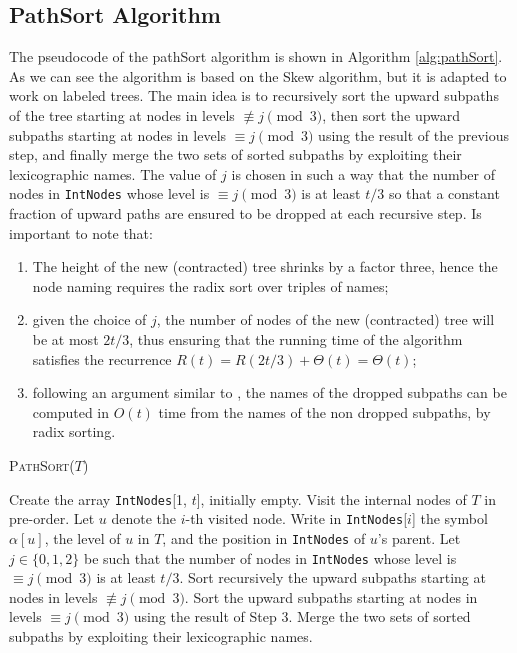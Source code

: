 \subsection{PathSort Algorithm}

The pseudocode of the pathSort algorithm is shown in Algorithm \ref{alg:pathSort}. As we can see the algorithm is based on the Skew algorithm, but it is adapted to work on labeled trees. The main idea is to recursively sort the upward subpaths of the tree starting at nodes in levels $\not\equiv j \pmod{3}$, then sort the upward subpaths starting at nodes in levels $\equiv j \pmod{3}$ using the result of the previous step, and finally merge the two sets of sorted subpaths by exploiting their lexicographic names. The value of $j$ is chosen in such a way that the number of nodes in \texttt{IntNodes} whose level is $\equiv j \pmod{3}$ is at least $t/3$ so that a constant fraction of upward paths are ensured to be dropped at each recursive step. Is important to note that:
\begin{enumerate}
    \item The height of the new (contracted) tree shrinks by a factor three, hence the node naming requires the radix sort over triples of names; 
    \item given the choice of $j$, the number of nodes of the new (contracted) tree will be at most $2t/3$, thus ensuring that the running time of the algorithm satisfies the recurrence $R(t) = R(2t/3) + \Theta(t) = \Theta(t)$; 
    \item following an argument similar to \cite{karkkainen2006linear}, the names of the dropped subpaths can be computed in $O(t)$ time from the names of the non dropped subpaths, by radix sorting.
\end{enumerate}

\begin{algorithm}
    \caption{\textsc{PathSort}($T$)}
    \label{alg:pathSort}
    \begin{algorithmic}[1]
    \State Create the array \texttt{IntNodes}[1, $t$], initially empty.
    \State Visit the internal nodes of $T$ in pre-order. Let $u$ denote the $i$-th visited node.
    \State Write in \texttt{IntNodes}[$i$] the symbol $\alpha[u]$, the level of $u$ in $T$, and the position in \texttt{IntNodes} of $u$'s parent.
    \State Let $j \in \{0, 1, 2\}$ be such that the number of nodes in \texttt{IntNodes} whose level is $\equiv j \pmod{3}$ is at least $t/3$. Sort recursively the upward subpaths starting at nodes in levels $\not\equiv j \pmod{3}$.
    \State Sort the upward subpaths starting at nodes in levels $\equiv j \pmod{3}$ using the result of Step 3.
    \State Merge the two sets of sorted subpaths by exploiting their lexicographic names.
    \end{algorithmic}
\end{algorithm}

